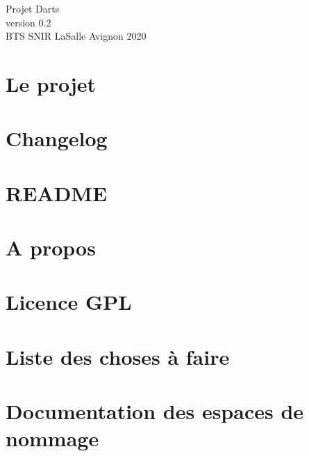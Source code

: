 \documentclass[twoside]{article}
\newcommand{\+}{\discretionary{\mbox{\scriptsize$\hookleftarrow$}}{}{}}
\begin{document}
\hypersetup{pageanchor=false,
             bookmarksnumbered=true,
             pdfencoding=unicode
            }
\begin{titlepage}
\vspace*{7cm}

\begin{center}%
{\LARGE Projet Darts}\\
\vspace*{1cm}
{\large version 0.\+2}\\
\vspace*{1cm}
{\large B\+T\+S S\+N\+I\+R La\+Salle Avignon 2020}\\
\end{center}
\end{titlepage}
\tableofcontents
{}
\hypersetup{pageanchor=true}

\section{Le projet}
\label{index}\hypertarget{index}{}
\section{Changelog}
\label{page_changelog}

\section{R\+E\+A\+D\+ME}
\label{page__r_e_a_d_m_e}

\section{A propos}
\label{page_about}

\section{Licence G\+PL}
\label{page_licence}

\section{Liste des choses à faire}
\label{todo}

\section{Documentation des espaces de nommage}

\end{document}
